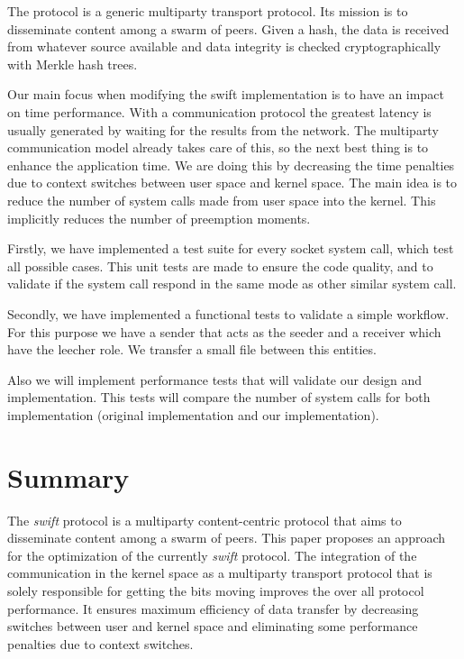 The  protocol is a generic multiparty transport protocol. Its mission is to
disseminate content among a swarm of peers.  Given a hash, the data is
received from whatever source available and data integrity is checked
cryptographically with Merkle hash trees. 

Our main focus when modifying the swift implementation is to have an impact on
time performance. With a communication protocol the greatest latency is
usually generated by waiting for the results from the network. The multiparty
communication model already takes care of this, so the next best thing is to
enhance the application time. We are doing this by decreasing the time
penalties due to context switches between user space and kernel space. The
main idea is to reduce the number of system calls made from user space into
the kernel. This implicitly reduces the number of preemption moments.

Firstly, we have implemented a test suite for every socket system call, which
test all possible cases.  This unit tests are made to ensure the code quality,
and to validate if the system call respond in the same mode as other similar
system call.

Secondly, we have implemented a functional tests to validate a simple
workflow. For this purpose we have a sender that acts as the seeder and a
receiver which have the leecher role. We transfer a small file between this
entities.

Also we will implement performance tests that will validate our design and
implementation. This tests will compare the number of system calls for both
implementation (original implementation and our implementation).

\section{Summary}
\label{sec:multiparty:summary}

The \textit{swift} protocol is a multiparty content-centric protocol that aims
to disseminate content among a swarm of peers. This paper proposes an approach
for the optimization of the currently \textit{swift} protocol. The integration
of the communication in the kernel space as a multiparty transport protocol
that is solely responsible for getting the bits moving improves the over all
protocol performance. It ensures maximum efficiency of data transfer by
decreasing switches between user and kernel space and eliminating some
performance penalties due to context switches.

